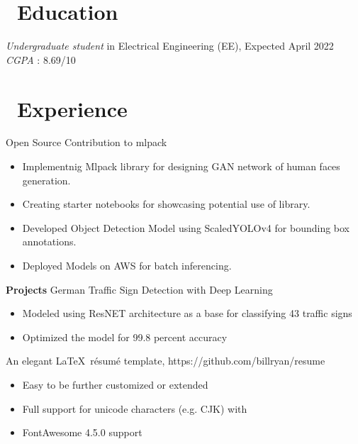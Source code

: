 \documentclass{resume}
\begin{document}



\section{\faGraduationCap\ Education}
\textit{Undergraduate student} in Electrical Engineering (EE), Expected April 2022 \\
\textit {CGPA} : 8.69/10

\section{\faUsers\ Experience}
\role{Student Developer} 
Open Source Contribution to mlpack
\begin{itemize}
  \item Implementnig Mlpack library for designing GAN network of human faces generation. 
  \item Creating starter notebooks for showcasing potential use of library. 
\end{itemize}

\begin{itemize}
  \item Developed Object Detection Model using ScaledYOLOv4 for bounding box annotations.
  \item Deployed Models on AWS for batch inferencing.
\end{itemize}

\textbf {Projects}
German Traffic Sign Detection with Deep Learning
\begin{itemize}
  \item Modeled using ResNET architecture as a base for classifying 43 traffic signs
  \item Optimized the model for 99.8 percent accuracy
\end{itemize}

An elegant \LaTeX\ résumé template, https://github.com/billryan/resume
\begin{itemize}
  \item Easy to be further customized or extended
  \item Full support for unicode characters (e.g. CJK) with \XeLaTeX\
  \item FontAwesome 4.5.0 support
\end{itemize}
\end{document}
